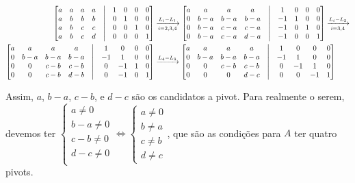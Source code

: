 \documentclass[leqno]{article}
\begin{document}
\begin{enumerate}
    \begin{align*}
    \begin{bmatrix}
    a & a & a & a & \bigm| & 1 & 0 & 0 & 0\\
    a & b & b & b & \bigm| & 0 & 1 & 0 & 0\\
    a & b & c & c & \bigm| & 0 & 0 & 1 & 0\\
    a & b & c & d & \bigm| & 0 & 0 & 0 & 1\\
    \end{bmatrix}&\xrightarrow[i=2,3,4]{L_i-L_1}\begin{bmatrix}
    a & a & a & a & \bigm| & 1 & 0 & 0 & 0\\
    0 & b-a & b-a & b-a & \bigm| & -1 & 1 & 0 & 0\\
    0 & b-a & c-a & c-a & \bigm| & -1 & 0 & 1 & 0\\
    0 & b-a & c-a & d-a & \bigm| & -1 & 0 & 0 & 1\\
    \end{bmatrix}\xrightarrow[i=3,4]{L_i-L_2}\\\begin{bmatrix}
    a & a & a & a & \bigm| & 1 & 0 & 0 & 0\\
    0 & b-a & b-a & b-a & \bigm| & -1 & 1 & 0 & 0\\
    0 & 0 & c-b & c-b & \bigm| & 0 & -1 & 1 & 0\\
    0 & 0 & c-b & d-b & \bigm| & 0 & -1 & 0 & 1\\
    \end{bmatrix}&\xrightarrow{L_4-L_3}\begin{bmatrix}
    a & a & a & a & \bigm| & 1 & 0 & 0 & 0\\
    0 & b-a & b-a & b-a & \bigm| & -1 & 1 & 0 & 0\\
    0 & 0 & c-b & c-b & \bigm| & 0 & -1 & 1 & 0\\
    0 & 0 & 0 & d-c & \bigm| & 0 & 0 & -1 & 1\\
    \end{bmatrix}\\
    \end{align*}
    
    Assim, $a$, $b-a$, $c-b$, e $d-c$ são os candidatos a pivot. Para realmente o serem, devemos ter $\begin{cases}a\neq0\\b-a\neq0\\c-b\neq0\\d-c\neq0\\\end{cases}\iff\begin{cases}a\neq0\\b\neq a\\c\neq b\\d\neq c\end{cases}$, que são as condições para $A$ ter quatro pivots.
    

\end{enumerate}
\end{document}
